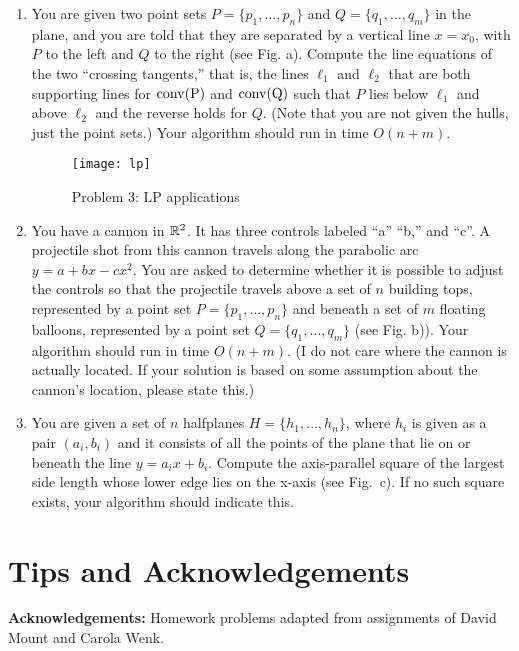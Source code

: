 \documentclass[11pt]{article}
\begin{document}
\begin{enumerate}

    \item You are given two point sets $P = \{p_1,\ldots,p_n\}$ and $Q =
        \{q_1,\ldots,q_m\}$ in the plane, and you are told that they are
        separated by a vertical line $x = x_0$, with $P$ to the left and $Q$ to
        the right (see Fig. a). Compute the line equations of the two
        ``crossing tangents,'' that is, the lines $\ell_1$ and $\ell_2$ that are
        both supporting lines for $\rm{conv}(P)$ and $\rm{conv}(Q)$ such that
        $P$ lies below $\ell_1$ and above $\ell_2$ and the reverse holds for
        $Q$. (Note that you are not given the hulls, just the point sets.) Your
        algorithm should run in time $O(n + m)$.

    \begin{figure}[h]
        \centering
        \texttt{[image: lp]}
        \caption{Problem 3: LP applications}
    \end{figure}


    \item You have a cannon in $\mathbb{R}^2$. It has three controls labeled ``a'' ``b,''
        and ``c''. A projectile shot from this cannon travels along the
        parabolic arc $y = a + bx - cx^2$. You are asked to determine whether it
        is possible to adjust the controls so that the projectile travels above
        a set of $n$ building tops, represented by a point set $P = \{p_1,
        \ldots , p_n\}$ and beneath a set of $m$ floating balloons, represented
        by a point set $Q = \{q_1, \ldots , q_m\}$ (see Fig. b)). Your algorithm
        should run in time $O(n + m)$. (I do not care where the cannon is
        actually located. If your solution is based on some assumption about the
        cannon's location, please state this.)

    \item You are given a set of $n$ halfplanes $H = \{h_1,\ldots,h_n\}$, where
        $h_i$ is given as a pair $(a_i,b_i)$ and it consists of all the points
        of the plane that lie on or beneath the line $y = a_ix + b_i$. Compute
        the axis-parallel square of the largest side length whose lower edge
        lies on the x-axis (see Fig.~c). If no such square exists, your
        algorithm should indicate this.

\end{enumerate}

\section*{Tips and Acknowledgements}

{\bf Acknowledgements:} Homework problems adapted from assignments of David
Mount and Carola Wenk.
\end{document}
